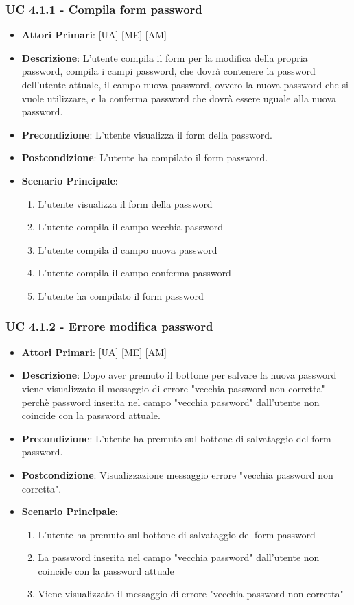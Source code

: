 			\subsubsection{UC 4.1.1 - Compila form password}
			\begin{itemize}
				\item \textbf{Attori Primari}: [UA] [ME] [AM]
				\item \textbf{Descrizione}: L'utente compila il form per la modifica della propria password, compila i campi password, che dovrà contenere la password dell'utente attuale, il campo nuova password, ovvero la nuova password che si vuole utilizzare, e la conferma password che dovrà essere uguale alla nuova password.
				\item \textbf{Precondizione}: L'utente visualizza il form della password.
				\item \textbf{Postcondizione}: L'utente ha compilato il form password.
				\item \textbf{Scenario Principale}:
				\begin{enumerate}
					\item{L'utente visualizza il form della password}
					\item{L'utente compila il campo vecchia password}
					\item{L'utente compila il campo nuova password}
					\item{L'utente compila il campo conferma password}
					\item{L'utente ha compilato il form password}
				\end{enumerate}
			\end{itemize}

			\subsubsection{UC 4.1.2 - Errore modifica password}
			\begin{itemize}
				\item \textbf{Attori Primari}: [UA] [ME] [AM]
				\item \textbf{Descrizione}: Dopo aver premuto il bottone per salvare la nuova password viene visualizzato il messaggio di errore "vecchia password non corretta" perchè password inserita nel campo "vecchia password" dall'utente non coincide con la password attuale.
				\item \textbf{Precondizione}: L'utente ha premuto sul bottone di salvataggio del form password.
				\item \textbf{Postcondizione}: Visualizzazione messaggio errore "vecchia password non corretta".
				\item \textbf{Scenario Principale}:
				\begin{enumerate}
					\item{L'utente ha premuto sul bottone di salvataggio del form password}
					\item{La password inserita nel campo "vecchia password" dall'utente non coincide con la password attuale}
					\item{Viene visualizzato il messaggio di errore "vecchia password non corretta"}
				\end{enumerate}
			\end{itemize}

